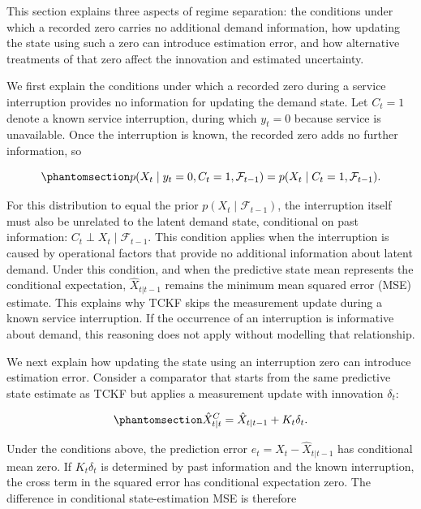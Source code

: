 \documentclass[
  11pt,
  authoryear,
  doubleblind,
  3p]{elsarticle}
\begin{document}
This section explains three aspects of regime separation: the conditions
under which a recorded zero carries no additional demand information,
how updating the state using such a zero can introduce estimation error,
and how alternative treatments of that zero affect the innovation and
estimated uncertainty.

We first explain the conditions under which a recorded zero during a
service interruption provides no information for updating the demand
state. Let \(C_t=1\) denote a known service interruption, during which
\(y_t=0\) because service is unavailable. Once the interruption is
known, the recorded zero adds no further information, so

\begin{equation}\phantomsection\label{eq-interruption-state}{
p(X_t \mid y_t=0,C_t=1,\mathcal{F}_{t-1})
=
p(X_t \mid C_t=1,\mathcal{F}_{t-1}).
}\end{equation}

For this distribution to equal the prior
\(p(X_t \mid \mathcal{F}_{t-1})\), the interruption itself must also be
unrelated to the latent demand state, conditional on past information:
\(C_t \perp X_t \mid \mathcal{F}_{t-1}\). This condition applies when
the interruption is caused by operational factors that provide no
additional information about latent demand. Under this condition, and
when the predictive state mean represents the conditional expectation,
\(\hat{X}_{t|t-1}\) remains the minimum mean squared error (MSE)
estimate. This explains why TCKF skips the measurement update during a
known service interruption. If the occurrence of an interruption is
informative about demand, this reasoning does not apply without
modelling that relationship.

We next explain how updating the state using an interruption zero can
introduce estimation error. Consider a comparator that starts from the
same predictive state estimate as TCKF but applies a measurement update
with innovation \(\delta_t\):

\begin{equation}\phantomsection\label{eq-regime}{
\hat{X}^{C}_{t|t}
=
\hat{X}_{t|t-1}
+
K_t\delta_t.
}\end{equation}

Under the conditions above, the prediction error
\(e_t=X_t-\hat{X}_{t|t-1}\) has conditional mean zero. If
\(K_t\delta_t\) is determined by past information and the known
interruption, the cross term in the squared error has conditional
expectation zero. The difference in conditional state-estimation MSE is
therefore
\end{document}
